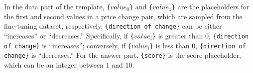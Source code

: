 %


In the data part of the template, \texttt{\{$value_0$\}} and \texttt{\{$value_1$\}} are the placeholders for the first and second values in a price change pair, which are sampled from the fine-tuning dataset, respectively.
\texttt{\{direction of change\}} can be either ``increases'' or ``decreases.''
Specifically, if \texttt{\{$value_i$\}} is greater than 0, \texttt{\{direction of change\}} is ``increases''; conversely, if \texttt{\{$value_i$\}} is less than 0, \texttt{\{direction of change\}} is ``decreases.''
For the answer part, \texttt{\{score\}} is the score placeholder, which can be an integer between 1 and 10.


